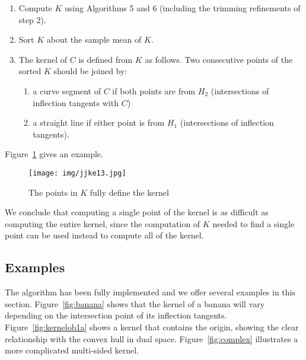 \documentclass[12pt]{article}
\begin{document}
\begin{enumerate}
\item Compute $K$ using Algorithms 5 and 6 (including the trimming refinements of step 2).
\item Sort $K$ about the sample mean of $K$.
\item The kernel of $C$ is defined from $K$ as follows.
      Two consecutive points of the sorted $K$ should be joined by:
\begin{enumerate}
\item a curve segment of $C$ if both points are from $H_2$ 
(intersections of inflection tangents with $C$)
\item a straight line if either point is from $H_1$ 
(intersections of inflection tangents).
\end{enumerate}
\end{enumerate}

Figure~\ref{fig:nohull} gives an example.

\begin{figure}
\begin{center}
\texttt{[image: img/jjke13.jpg]}
\end{center}
\caption{The points in $K$ fully define the kernel}
\label{fig:nohull}
\end{figure}

We conclude that computing a single point of the kernel is as difficult
as computing the entire kernel,
since the computation of $K$ needed to find a single point can be used
instead to compute all of the kernel.



\subsection{Examples}
\label{sec:eg}

The algorithm has been fully implemented and we offer 
several examples in this section.
Figure~\ref{fig:banana} shows that 
the kernel of a banana will vary depending on the intersection
point of its inflection tangents.
Figure~\ref{fig:kernelob1a} shows a kernel
that contains the origin, showing the clear relationship with
the convex hull in dual space.
Figure~\ref{fig:complex} illustrates a more complicated multi-sided kernel.
\end{document}
